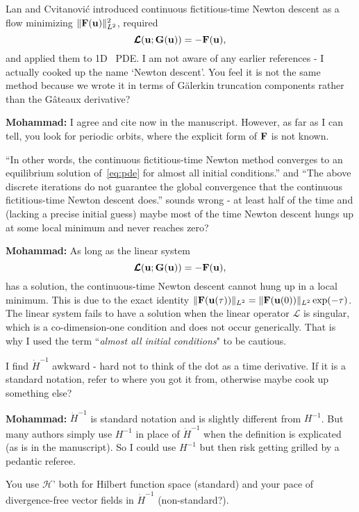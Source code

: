 \begin{description}
{Lan and Cvitanovi\'c introduced continuous fictitious-time Newton
descent  as a flow minimizing $\|\mathbf F
(\mathbf u)\|^2_{L^2}$, required
\[
\pmb{\mathcal L}(\mathbf u;\mathbf G(\mathbf u))=-\mathbf F(\mathbf u),
\]
 and applied them to 1D \KSe\ PDE. I am not aware of
any earlier references - I actually cooked up the name `Newton descent'.
You feel it is not the same method because we wrote it in terms of
G\"{a}lerkin truncation components rather than the G\^ateaux
derivative?

{\bf Mohammad:} I agree and cite  now in the manuscript. However, as
far as I can tell,
you look for periodic orbits, where the explicit form of $\bf F$ is not known.

``In other words, the continuous fictitious-time
Newton method converges to an equilibrium solution of~\eqref{eq:pde} for
almost all initial conditions.'' and
``The above discrete iterations do not guarantee the global
convergence that the continuous fictitious-time Newton descent does.''
sounds wrong - at least half of the time
and (lacking a precise initial guess) maybe most of the time Newton descent
hungs up at some local minimum and never reaches zero?

{\bf Mohammad:} As long as the linear system
\[
\pmb{\mathcal L}(\mathbf u;\mathbf G(\mathbf u))=-\mathbf F(\mathbf u),
\]
has a solution, the continuous-time Newton descent cannot hung up in a local minimum. This is due
to the exact identity $\|\mathbf F(\mathbf u(\tau))\|_{L^2}=\|\mathbf F(\mathbf u(0))\|_{L^2}\exp(-\tau)$.
The linear system fails to have a solution when the linear operator $\pmb{\mathcal L}$
is singular, which is a co-dimension-one condition and does not occur generically.
That is why I used the term ``\emph{almost all initial conditions}" to be cautious.


I find $\dot H^{-1}$ awkward - hard not to think of the dot as a time derivative.
If it is a standard notation, refer to where you got it from, otherwise
maybe cook up something else?

{\bf Mohammad:} $\dot H^{-1}$ is standard notation
and is slightly
different from $H^{-1}$. But many authors simply use $H^{-1}$
in place of $\dot H^{-1}$ when the definition is explicated (as is in the manuscript).
So I could use $H^{-1}$ but then risk getting grilled by a pedantic referee.

You use $\mathcal H$' both for Hilbert function space (standard) and your
pace of divergence-free vector fields in $\dot H^{-1}$ (non-standard?).

}
\end{description}
